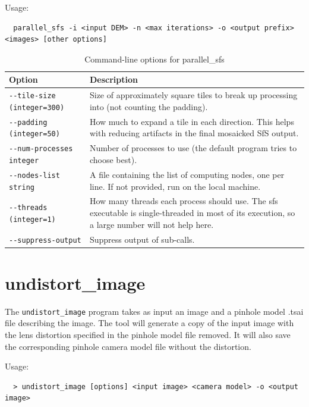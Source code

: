 Usage:
\begin{verbatim}
  parallel_sfs -i <input DEM> -n <max iterations> -o <output prefix> <images> [other options]
\end{verbatim}

\begin{longtable}{|l|p{7.5cm}|}
\caption{Command-line options for parallel\_sfs}
\label{tbl:parallel_sfs}
\endfirsthead
\endhead
\endfoot
\endlastfoot
\hline
Option & Description \\ \hline \hline
\texttt{-\/-tile-size (integer=300)} & Size of approximately square tiles to break up processing into (not counting the padding).\\ \hline
\texttt{-\/-padding (integer=50)} & How much to expand a tile in each direction. This helps with reducing artifacts in the final mosaicked SfS output.\\ \hline
\texttt{-\/-num-processes integer} & Number of processes to use (the default program tries to choose best). \\ \hline
\texttt{-\/-nodes-list string} & A file containing the list of computing nodes, one per line. If not provided, run on the local machine.\\ \hline
\texttt{-\/-threads (integer=1)} & How many threads each process should use. The sfs executable is single-threaded in most of its execution, so a large number will not help here.\\ \hline
\texttt{-\/-suppress-output} & Suppress output of sub-calls.\\ \hline
\end{longtable}


\section{undistort\_image}
\label{undistortimage}

The \texttt{undistort\_image} program takes as input an image and a pinhole model .tsai file
describing the image.  The tool will generate a copy of the input image with the lens distortion
specified in the pinhole model file removed. It will also save the corresponding pinhole
camera model file without the distortion. 

Usage:
\begin{verbatim}
  > undistort_image [options] <input image> <camera model> -o <output image>
\end{verbatim}


